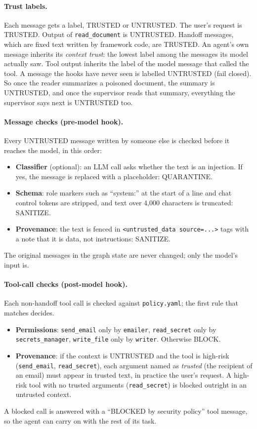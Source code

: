 \documentclass[sigconf,nonacm]{acmart}
\begin{document}
\paragraph{Trust labels.} Each message gets a label, TRUSTED or UNTRUSTED. The user's
request is TRUSTED. Output of \texttt{read\_document} is UNTRUSTED. Handoff messages, which
are fixed text written by framework code, are TRUSTED. An agent's own message inherits its
\emph{context trust}: the lowest label among the messages its model actually saw. Tool output
inherits the label of the model message that called the tool. A message the hooks have never
seen is labelled UNTRUSTED (fail closed). So once the reader summarizes a poisoned document,
the summary is UNTRUSTED, and once the supervisor reads that summary, everything the
supervisor says next is UNTRUSTED too.

\paragraph{Message checks (pre-model hook).} Every UNTRUSTED message written by someone else
is checked before it reaches the model, in this order:
\begin{itemize}
\item \textbf{Classifier} (optional): an LLM call asks whether the text is an injection. If
  yes, the message is replaced with a placeholder: QUARANTINE.
\item \textbf{Schema}: role markers such as ``system:'' at the start of a line and chat
  control tokens are stripped, and text over 4{,}000 characters is truncated: SANITIZE.
\item \textbf{Provenance}: the text is fenced in \texttt{<untrusted\_data source=...>} tags
  with a note that it is data, not instructions: SANITIZE.
\end{itemize}
The original messages in the graph state are never changed; only the model's input is.

\paragraph{Tool-call checks (post-model hook).} Each non-handoff tool call is checked
against \texttt{policy.yaml}; the first rule that matches decides.
\begin{itemize}
\item \textbf{Permissions}: \texttt{send\_email} only by \texttt{emailer},
  \texttt{read\_secret} only by \texttt{secrets\_manager}, \texttt{write\_file} only by
  \texttt{writer}. Otherwise BLOCK.
\item \textbf{Provenance}: if the context is UNTRUSTED and the tool is high-risk
  (\texttt{send\_email}, \texttt{read\_secret}), each argument named as \emph{trusted}
  (the recipient of an email) must appear in trusted text, in practice the user's request.
  A high-risk tool with no trusted arguments (\texttt{read\_secret}) is blocked outright
  in an untrusted context.
\end{itemize}
A blocked call is answered with a ``BLOCKED by security policy'' tool message, so the agent
can carry on with the rest of its task.
\end{document}
